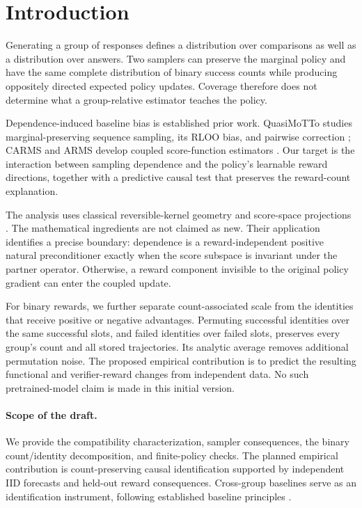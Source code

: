 \section{Introduction}
Generating a group of responses defines a distribution over comparisons as well as
a distribution over answers. Two samplers can preserve the marginal policy and
have the same complete distribution of binary success counts while producing
oppositely directed expected policy updates. Coverage therefore does not determine
what a group-relative estimator teaches the policy.

Dependence-induced baseline bias is established prior work. QuasiMoTTo studies
marginal-preserving sequence sampling, its RLOO bias, and pairwise correction
\citep{li2026quasimotto}; CARMS and ARMS develop coupled score-function estimators
\citep{dimitriev2021carms,dimitriev2021arms}. Our target is the interaction between
sampling dependence and the policy's learnable reward directions, together with
a predictive causal test that preserves the reward-count explanation.

The analysis uses classical reversible-kernel geometry and score-space projections
\citep{sherlock2018reversible,sutton1999policy,kakade2001natural}. The mathematical
ingredients are not claimed as new. Their application identifies a precise boundary:
dependence is a reward-independent positive natural preconditioner exactly when
the score subspace is invariant under the partner operator. Otherwise, a reward
component invisible to the original policy gradient can enter the coupled update.

For binary rewards, we further separate count-associated scale from the identities
that receive positive or negative advantages. Permuting successful identities over
the same successful slots, and failed identities over failed slots, preserves every
group's count and all stored trajectories. Its analytic average removes additional
permutation noise. The proposed empirical contribution is to predict the resulting
functional and verifier-reward changes from independent data. No such pretrained-model
claim is made in this initial version.

\paragraph{Scope of the draft.}
We provide the compatibility characterization, sampler consequences, the binary
count/identity decomposition, and finite-policy checks. The planned empirical
contribution is count-preserving causal identification supported by independent
IID forecasts and held-out reward consequences. Cross-group baselines serve as
an identification instrument, following established baseline principles
\citep{greensmith2004variance,chung2020beyond}.
